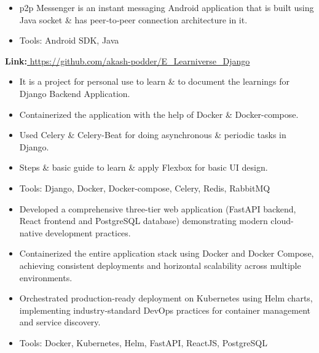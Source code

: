 \documentclass[10pt,a4paper,ragged2e,withhyper]{altacv}
\begin{document}


\vspace{0.3em}
\begin{itemize}
\item p2p Messenger is an instant messaging Android application that is built using Java socket \& has peer‑to‑peer connection architecture in it.
\item Tools: Android SDK, Java
\end{itemize}

\vspace{0.3em}
\faLink\textbf{Link:}{\href{https://github.com/akash-podder/E-Learniverse-Django}{ https://github.com/akash-podder/E\_Learniverse\_Django}}
\vspace{0.3em}
\begin{itemize}
\item It is a project for personal use to learn \& to document the learnings for Django Backend Application.
\item Containerized the application with the help of Docker \& Docker-compose.
\item Used Celery \& Celery-Beat for doing asynchronous \& periodic tasks in Django.
\item Steps \& basic guide to learn \& apply Flexbox for basic UI design.
\item Tools: Django, Docker, Docker-compose, Celery, Redis, RabbitMQ
\end{itemize}


\vspace{0.3em}
\begin{itemize}
\item Developed a comprehensive three-tier web application (FastAPI backend, React frontend and PostgreSQL database) demonstrating modern cloud-native development practices.
\item Containerized the entire application stack using Docker and Docker Compose, achieving consistent deployments and horizontal scalability across multiple environments.
\item Orchestrated production-ready deployment on Kubernetes using Helm charts, implementing industry-standard DevOps practices for container management and service discovery.
\item Tools: Docker, Kubernetes, Helm, FastAPI, ReactJS, PostgreSQL
\end{itemize}
\end{document}
